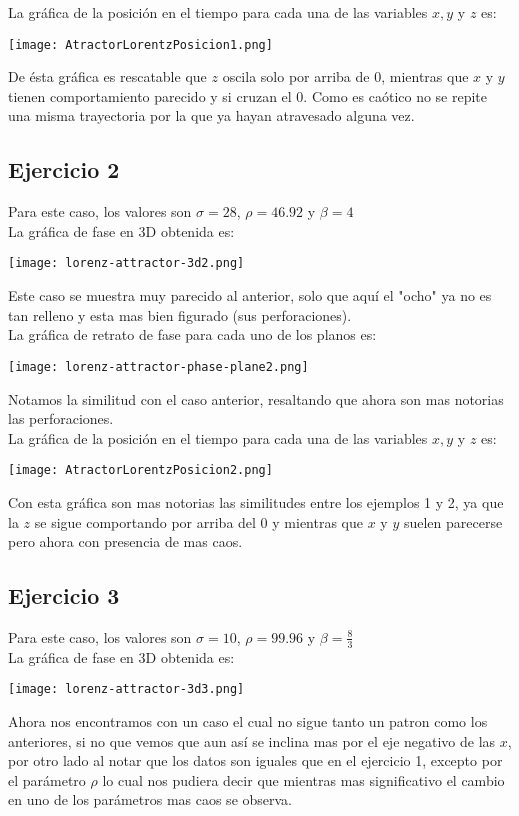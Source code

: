 \documentclass[12pt]{article}
\begin{document}
La gráfica de la posición en el tiempo para cada una de las variables $x, y$ y $z$ es:
\begin{center}
    \texttt{[image: AtractorLorentzPosicion1.png]}\\
\end{center}
De ésta gráfica es rescatable que $z$ oscila solo por arriba de 0, mientras que $x$ y $y$ tienen comportamiento parecido y si cruzan el 0. Como es caótico no se repite una misma trayectoria por la que ya hayan atravesado alguna vez.

\subsection*{Ejercicio 2}
Para este caso, los valores son $\sigma= 28$, $\rho=46.92$ y $\beta=4$\\
La gráfica de fase en 3D obtenida es:
\begin{center}
    \texttt{[image: lorenz-attractor-3d2.png]}\\
\end{center}
Este caso se muestra muy parecido al anterior, solo que aquí el "ocho" ya no es tan relleno y esta mas bien figurado (sus perforaciones).\\

La gráfica de retrato de fase para cada uno de los planos es:
\begin{center}
    \texttt{[image: lorenz-attractor-phase-plane2.png]}\\
\end{center}
Notamos la similitud con el caso anterior, resaltando que ahora son mas notorias las perforaciones.\\

La gráfica de la posición en el tiempo para cada una de las variables $x, y$ y $z$ es:
\begin{center}
    \texttt{[image: AtractorLorentzPosicion2.png]}\\
\end{center}
Con esta gráfica son mas notorias las similitudes entre los ejemplos 1 y 2, ya que la $z$ se sigue comportando por arriba del 0 y mientras que $x$ y $y$ suelen parecerse pero ahora con presencia de mas caos.

\subsection*{Ejercicio 3}
Para este caso, los valores son $\sigma= 10$, $\rho=99.96$ y $\beta=\frac{8}{3}$\\
La gráfica de fase en 3D obtenida es:
\begin{center}
    \texttt{[image: lorenz-attractor-3d3.png]}\\
\end{center}
Ahora nos encontramos con un caso el cual no sigue tanto un patron como los anteriores, si no que vemos que aun así se inclina mas por el eje negativo de las $x$, por otro lado al notar que los datos son iguales que en el ejercicio 1, excepto por el parámetro $\rho$ lo cual nos pudiera decir que mientras mas significativo el cambio en uno de los parámetros mas caos se observa.\\
\end{document}
